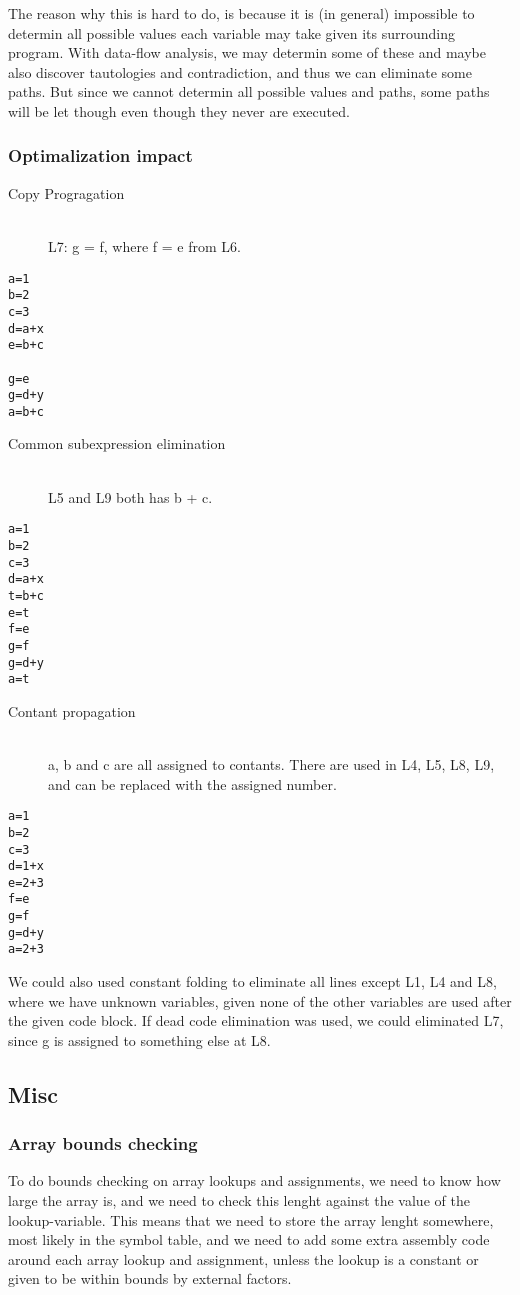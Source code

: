 \documentclass[english,a4paper]{scrartcl}
\begin{document}
The reason why this is hard to do, is because it is (in general) impossible to
determin all possible values each variable may take given its surrounding
program. With data-flow analysis, we may determin some of these and maybe also
discover tautologies and contradiction, and thus we can eliminate some paths.
But since we cannot determin all possible values and paths, some paths will be
let though even though they never are executed.

\subsubsection{Optimalization impact}
\begin{description}
\item[Copy Progragation] \ \\
L7: g = f, where f = e from L6.
\end{description}
\begin{lstlisting}
a=1
b=2
c=3
d=a+x
e=b+c

g=e
g=d+y
a=b+c
\end{lstlisting}
\begin{description}
\item[Common subexpression elimination] \ \\
L5 and L9 both has b + c.
\end{description}
\begin{lstlisting}
a=1
b=2
c=3
d=a+x
t=b+c
e=t
f=e
g=f
g=d+y
a=t
\end{lstlisting}
\begin{description}
\item[Contant propagation] \ \\
a, b and c are all assigned to contants. There are used in L4, L5, L8, L9, and
can be replaced with the assigned number.    
\end{description}
\begin{lstlisting}
a=1
b=2
c=3
d=1+x
e=2+3
f=e
g=f
g=d+y
a=2+3
\end{lstlisting}
We could also used constant folding to eliminate all lines except L1, L4 and L8,
where we have unknown variables, given none of the other variables are used
after the given code block. If dead code elimination was used, we could
eliminated L7, since g is assigned to something else at L8.

\subsection{Misc}
\subsubsection{Array bounds checking}
To do bounds checking on array lookups and assignments, we need to know how
large the array is, and we need to check this lenght against the value of the
lookup-variable. This means that we need to store the array lenght somewhere,
most likely in the symbol table, and we need to add some extra assembly code
around each array lookup and assignment, unless the lookup is a constant or
given to be within bounds by external factors.
\end{document}
